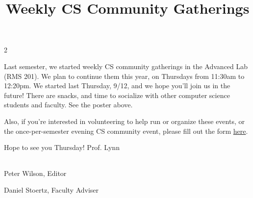 \documentclass[12pt]{article}
\newcommand{\bolder}{\textbf}
\begin{document}
\begin{multicols}{2}
\begin{tcolorbox}[colback=white, colframe=black]
\begin{center}
    \title{{\large \bolder{ Weekly CS Community Gatherings}}}
    \end{center}
    
\end{tcolorbox}

Last semester, we started weekly CS community gatherings in the Advanced Lab (RMS 201). We plan to continue them this year, on Thursdays from 11:30am to 12:20pm. We started last Thursday, 9/12, and we hope you'll join us in the future! There are snacks, and time to socialize with other computer science students and faculty. See the poster above.

Also, if you're interested in volunteering to help run or organize these events, or the once-per-semester evening CS community event, please fill out the form \href{https://forms.gle/SL6ExWumiBUJptUy7}{here}.

Hope to see you Thursday!
Prof. Lynn

\end{multicols}




\\
	
\hfill Peter Wilson, Editor
	
\hfill Daniel Stoertz, Faculty Adviser


 
\end{document}
